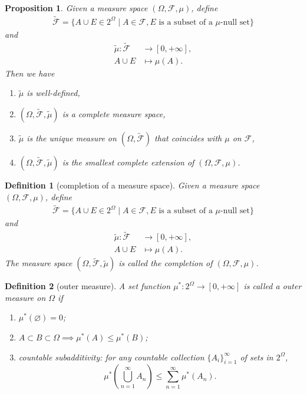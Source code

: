 \documentclass{report}
\newtheorem{definition}{Definition}[section]
\newtheorem{proposition}{Proposition}[section]
\theoremstyle{nonumberplain}
\begin{document}
\begin{proposition}
	Given a measure space $(\Omega, \mathcal{F}, \mu)$, define
	\begin{align*}
		\widetilde{\mathcal{F}}=\{A\cup E\in 2^\Omega\mid A\in\mathcal{F},E\text{ is a subset of a $\mu$-null set} \}
	\end{align*}
	and
	\begin{align*}
		\widetilde{\mu}:\widetilde{\mathcal{F}}&\longrightarrow[0,+\infty],\\
		A\cup E&\longmapsto \mu(A).
	\end{align*}
Then we have
\begin{enumerate}[(1)]
	\item $\widetilde{\mu}$ is well-defined,
	\item $(\Omega, \widetilde{\mathcal{F}}, \widetilde{\mu})$ is a complete measure space,
	\item $\widetilde{\mu}$ is the unique measure on $(\Omega, \widetilde{\mathcal{F}})$ that coincides with $\mu$ on $\mathcal{F}$,
	\item $(\Omega, \widetilde{\mathcal{F}}, \widetilde{\mu})$ is the smallest complete extension of $(\Omega, \mathcal{F}, \mu)$.
\end{enumerate}
\end{proposition}

\begin{definition}[completion of a measure space]
	Given a measure space $(\Omega, \mathcal{F}, \mu)$, define
	\begin{align*}
		\widetilde{\mathcal{F}}=\{A\cup E\in 2^\Omega\mid A\in\mathcal{F},E\text{ is a subset of a $\mu$-null set} \}
	\end{align*}
	and
	\begin{align*}
		\widetilde{\mu}:\widetilde{\mathcal{F}}&\longrightarrow[0,+\infty],\\
		A\cup E&\longmapsto \mu(A).
	\end{align*}
The measure space $(\Omega, \widetilde{\mathcal{F}}, \widetilde{\mu})$ is called the \emph{completion of $(\Omega, \mathcal{F}, \mu)$}.
\end{definition}

\begin{definition}[outer measure]
	A set function $\mu^*:2^\Omega\to[0,+\infty]$  is called a \emph{outer measure} on $\Omega$ if
	\begin{enumerate}[(1)]
		\item $\mu^*(\varnothing) = 0$;
		\item $A\subset B\subset\Omega\implies\mu^*(A) \le\mu^*(B)$;
		\item countable subadditivity: for any countable collection $\{A_{i}\}_{i=1}^{\infty }$ of sets in $2^\Omega$,
		\[
		\mu^*\left(\bigcup_{n=1}^\infty A_n\right)\le\sum_{n=1}^{\infty}\mu^*(A_n).
		\]
	\end{enumerate}
\end{definition}
\end{document}
